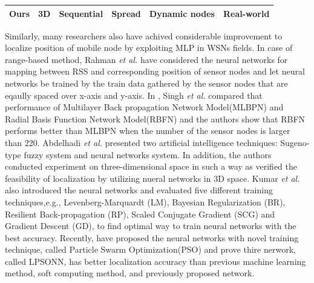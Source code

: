 \documentclass[letterpaper, 10 pt, conference]{ieeeconf}  %
\begin{document}
\begin{table}[ht]
\begin{tabular}{l|l|l|l|l|l}
		Ours&
		\multicolumn{1}{c}{3D \checkmark}                   &      
		\multicolumn{1}{c}{Sequential \checkmark}                 &   \multicolumn{1}{c}{Spread \checkmark}                   & 
		\multicolumn{1}{c}{Dynamic nodes \checkmark}        &   \multicolumn{1}{c}{Real-world \checkmark}   \\ 
		\bottomrule
	\end{tabular}
	\label{table:related_worsk}
	
\end{table}


Similarly, many researchers also have achived considerable improvement to localize position of mobile node by exploiting MLP in WSNs fields\cite{shareef2008localization, rahman2009localization, singh2013tdoa,abdelhadi2013efficient,bernas2015fully, kumar2016localization, banihashemian2018new}. In case of range-based method, Rahman \textit{et al.} \cite{rahman2009localization} have considered the neural networks for mapping between RSS and corresponding position of sensor nodes and let neural networks be trained by the train data gathered by the sensor nodes that are eqaully spaced over x-axis and y-axis. In \cite{singh2013tdoa}, Singh \textit{et al.} compared that performance of Multilayer Back propagation Network Model(MLBPN) and Radial Basis Function Network Model(RBFN) and the authors show that RBFN performs better than MLBPN when the number of the sensor nodes is larger than 220. Abdelhadi \textit{et al.}  \cite{abdelhadi2013efficient} presented two artificial intelligence techniques: Sugeno-type fuzzy system and neural networks system. In addition, the authors conducted experiment on three-dimensional space in such a way as verified the feasibility of localization by utilizing nueral networks in 3D space. Kumar \textit{et al.} \cite{kumar2016localization} also introduced the neural networks and evaluated five different training techniques,e.g., Levenberg-Marquardt (LM), Bayesian Regularization
(BR), Resilient Back-propagation (RP), Scaled Conjugate Gradient (SCG) and Gradient
Descent (GD), to find optimal way to train neural networks with the best accuracy. Recently, \cite{banihashemian2018new} have proposed the neural networks with novel training technique, called Particle Swarm Optimization(PSO) and prove thire nerwork, called LPSONN, has better localization accuracy than previous machine learning method, soft computing method, and previously proposed network.
\end{document}

